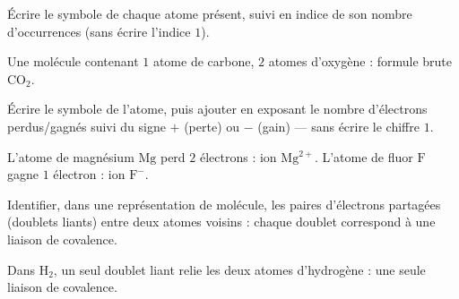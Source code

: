 Écrire le symbole de chaque atome présent, suivi en indice de son nombre d'occurrences
(sans écrire l'indice $1$).
\begin{exemple}
Une molécule contenant $1$ atome de carbone, $2$ atomes d'oxygène : formule brute
$\mathrm{CO_2}$.
\end{exemple}

Écrire le symbole de l'atome, puis ajouter en exposant le nombre d'électrons
perdus/gagnés suivi du signe $+$ (perte) ou $-$ (gain) — sans écrire le chiffre $1$.
\begin{exemple}
L'atome de magnésium $\mathrm{Mg}$ perd $2$ électrons : ion $\mathrm{Mg^{2+}}$. L'atome de
fluor $\mathrm{F}$ gagne $1$ électron : ion $\mathrm{F^-}$.
\end{exemple}

Identifier, dans une représentation de molécule, les paires d'électrons partagées
(doublets liants) entre deux atomes voisins : chaque doublet correspond à une liaison de
covalence.
\begin{exemple}
Dans $\mathrm{H_2}$, un seul doublet liant relie les deux atomes d'hydrogène : une seule
liaison de covalence.
\end{exemple}

